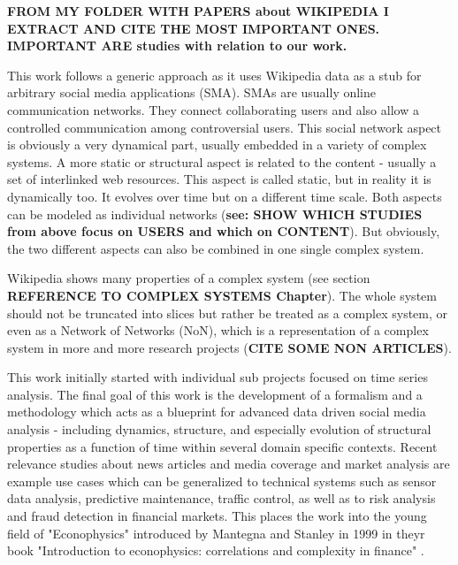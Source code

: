 \documentclass[a4paper,10pt]{scrbook}
\begin{document}
\textbf{FROM MY FOLDER WITH PAPERS about WIKIPEDIA I EXTRACT AND CITE THE MOST IMPORTANT ONES.
IMPORTANT ARE studies with relation to our work.}

%
This work follows a generic approach as it uses Wikipedia data as a stub for arbitrary social media applications (SMA). SMAs are usually online communication networks. They connect collaborating users and also allow a controlled communication among controversial users. This social network aspect is obviously a very dynamical part, usually embedded in a variety of complex systems. A more static or structural aspect is related to the content - usually a set of interlinked web resources. This aspect is called static, but in reality it is dynamically too. It evolves over time but on a different time scale. Both aspects can be modeled as individual networks (\textbf{see: SHOW WHICH STUDIES from above focus on USERS and which on CONTENT}). But obviously, the two different aspects can also be combined in one single complex system.

Wikipedia shows many properties of a complex system (see section \textbf{REFERENCE TO COMPLEX SYSTEMS Chapter}). The whole system should not be truncated into slices but rather be treated as a complex system, or even as a Network of Networks (NoN), which is a representation of a complex system in more and more research projects (\textbf{CITE SOME NON ARTICLES}).

This work initially started with individual sub projects focused on time series analysis. The final goal of this work is the development of a formalism and a methodology which acts as a blueprint for advanced data driven social media analysis - including dynamics, structure, and especially evolution of structural properties as a function of time within several domain specific contexts. Recent relevance studies about news articles and media coverage \cite{Segev2010} and market analysis \cite{Wang2006} are example use cases which can be generalized to technical systems such as sensor data analysis, predictive maintenance, traffic control, as well as to risk analysis and fraud detection in financial markets. This places the work into the young field of "Econophysics" introduced by Mantegna and Stanley in 1999 in theyr book "Introduction to econophysics: correlations and complexity in finance" \cite{Mantegna1999introduction}. 
\end{document}
